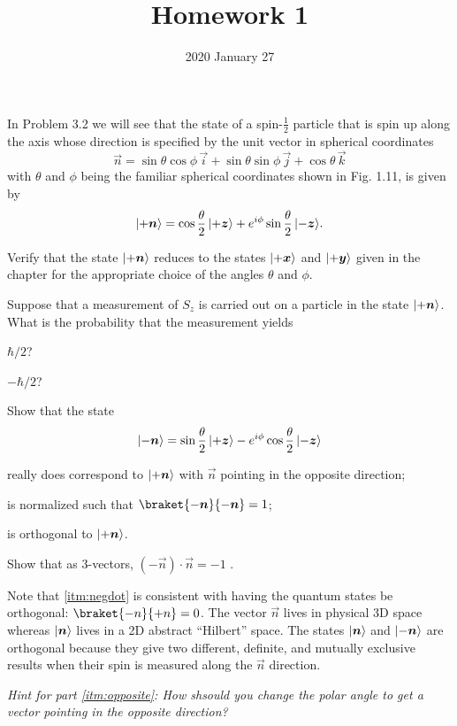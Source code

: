 \documentclass{../phys116}
\title{Homework 1}
\author{}
\date{2020 January 27}
\begin{document}
\begin{exercise}
  In Problem 3.2 we will see that the state of a spin-\(\frac 1 2\)
  particle that is spin up along the axis whose direction is specified
  by the unit vector in spherical coordinates
  \[
    \vec n
    = \sin \theta \cos \phi \, \vec i
    + \sin \theta \sin \phi \, \vec j
    + \cos \theta \, \vec k
  \]
  with \(\theta\) and \(\phi\) being the familiar spherical
  coordinates shown in Fig. 1.11, is given by
  \[
    \ket{+\vec n}
    = \cos \frac \theta 2 \, \ket{+\vec z}
    + e^{i\phi} \sin \frac \theta 2 \, \ket{-\vec z}.
  \]
  \begin{problems}
  \item Verify that the state \(\ket{+\vec n}\) reduces to the states
    \(\ket{+\vec x}\) and \(\ket{+\vec y}\) given in the chapter for
    the appropriate choice of the angles \(\theta\) and \(\phi\).
  \item Suppose that a measurement of \(S_z\) is carried out on a
    particle in the state \(\ket{+\vec n}\).  What is the probability
    that the measurement yields
    \begin{enumerate*}[label=(\roman*)]
    \item \(\hbar/2\)?
    \item \(-\hbar/2\)?
    \end{enumerate*}
  \end{problems}
\end{exercise}

\begin{solution}
\end{solution}

\begin{exercise}
  Show that the state
  \[
    \ket{-\vec n}
    = \sin \frac \theta 2 \, \ket{+\vec z}
    - e^{i\phi} \cos \frac \theta 2 \, \ket{-\vec z}
  \]
  \begin{problems}
  \item really does correspond to \(\ket{+\vec n}\) with \(\vec n\)
    pointing in the opposite direction; \label{itm:opposite}
  \item is normalized such that \(\braket{-\vec n}{-\vec n} = 1\);
  \item is orthogonal to \(\ket{+\vec n}\).
  \item Show that as \(3\)-vectors, \((-\vec n) \cdot \vec n = -1\)
    \label{itm:negdot}.
  \end{problems}
  Note that \ref{itm:negdot} is consistent with having the quantum
  states be orthogonal: \(\braket{-n}{+n} = 0\).  The vector
  \(\vec n\) lives in physical 3D space whereas \(\ket{\vec n}\) lives
  in a 2D abstract ``Hilbert'' space.  The states \(\ket{\vec n}\) and
  \(\ket{-\vec n}\) are orthogonal because they give two different,
  definite, and mutually exclusive results when their spin is measured
  along the \(\vec n\) direction.

  \textit{Hint for part \ref{itm:opposite}: How shsould you change the
    polar angle to get a vector pointing in the opposite direction?}
\end{exercise}

\begin{solution}
\end{solution}
\end{document}
